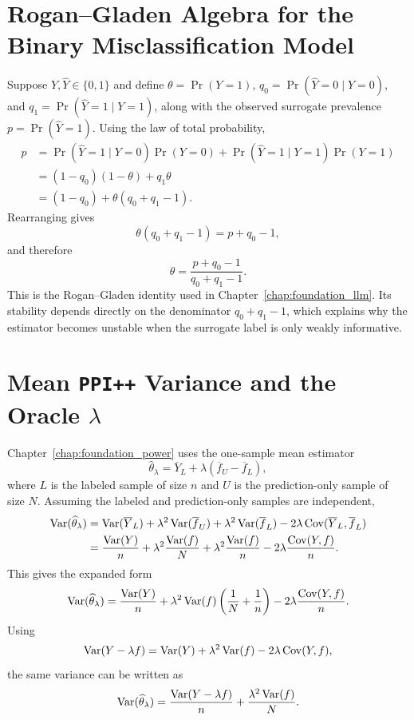 \section{Rogan--Gladen Algebra for the Binary Misclassification Model}

Suppose $Y,\widehat{Y}\in\{0,1\}$ and define \(\theta = \Pr(Y=1)\), \(q_0=\Pr(\widehat{Y}=0\mid Y=0)\), and \(q_1=\Pr(\widehat{Y}=1\mid Y=1)\), along with the observed surrogate prevalence \(p=\Pr(\widehat{Y}=1)\).
Using the law of total probability,
\begin{align*}
p
&=
\Pr(\widehat{Y}=1\mid Y=0)\Pr(Y=0)
+
\Pr(\widehat{Y}=1\mid Y=1)\Pr(Y=1) \\
&=
(1-q_0)(1-\theta)+q_1\theta \\
&=
(1-q_0)+\theta(q_0+q_1-1).
\end{align*}
Rearranging gives
\[
\theta(q_0+q_1-1)=p+q_0-1,
\]
and therefore
\[
\theta=\frac{p+q_0-1}{q_0+q_1-1}.
\]
This is the Rogan--Gladen identity used in Chapter~\ref{chap:foundation_llm}. Its stability depends directly on the denominator $q_0+q_1-1$, which explains why the estimator becomes unstable when the surrogate label is only weakly informative.

\section{Mean \texorpdfstring{\texttt{PPI++}}{PPI++} Variance and the Oracle \texorpdfstring{$\lambda$}{lambda}}

Chapter~\ref{chap:foundation_power} uses the one-sample mean estimator
\[
\widehat{\theta}_{\lambda}
=
\overline{Y}_{L}
+
\lambda(\overline{f}_{U}-\overline{f}_{L}),
\]
where $L$ is the labeled sample of size $n$ and $U$ is the prediction-only sample of size $N$. Assuming the labeled and prediction-only samples are independent,
\begin{align*}
\operatorname{Var}(\widehat{\theta}_{\lambda})
&=
\operatorname{Var}(\overline{Y}_{L})
+
\lambda^2\operatorname{Var}(\overline{f}_{U})
+
\lambda^2\operatorname{Var}(\overline{f}_{L})
-2\lambda\operatorname{Cov}(\overline{Y}_{L},\overline{f}_{L}) \\
&=
\frac{\operatorname{Var}(Y)}{n}
+
\lambda^2\frac{\operatorname{Var}(f)}{N}
+
\lambda^2\frac{\operatorname{Var}(f)}{n}
-2\lambda\frac{\operatorname{Cov}(Y,f)}{n}.
\end{align*}
This gives the expanded form
\[
\operatorname{Var}(\widehat{\theta}_{\lambda})
=
\frac{\operatorname{Var}(Y)}{n}
+
\lambda^2\operatorname{Var}(f)\left(\frac{1}{N}+\frac{1}{n}\right)
-2\lambda\frac{\operatorname{Cov}(Y,f)}{n}.
\]
Using
\[
\operatorname{Var}(Y-\lambda f)=\operatorname{Var}(Y)+\lambda^2\operatorname{Var}(f)-2\lambda\operatorname{Cov}(Y,f),
\]
the same variance can be written as
\[
\operatorname{Var}(\widehat{\theta}_{\lambda})
=
\frac{\operatorname{Var}(Y-\lambda f)}{n}
+
\frac{\lambda^2\operatorname{Var}(f)}{N}.
\]

